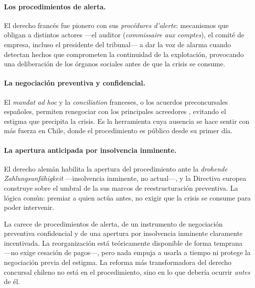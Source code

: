 \paragraph{Los procedimientos de alerta.} El derecho francés fue pionero con sus
\emph{procédures d'alerte}: mecanismos que obligan a distintos actores ---el auditor
(\emph{commissaire aux comptes}), el comité de empresa, incluso el presidente del tribunal--- a dar
la voz de alarma cuando detectan hechos que comprometen la continuidad de la explotación,
provocando una deliberación de los órganos sociales antes de que la crisis se consume.

\paragraph{La negociación preventiva y confidencial.} El \emph{mandat ad hoc} y la
\emph{conciliation} franceses, o los acuerdos preconcursales españoles, permiten renegociar con los
principales acreedores , evitando el estigma que precipita la crisis. Es la
herramienta cuya ausencia se hace sentir con más fuerza en Chile, donde el procedimiento es público
desde su primer día.

\paragraph{La apertura anticipada por insolvencia inminente.} El derecho alemán habilita la apertura
del procedimiento ante la \emph{drohende Zahlungsunfähigkeit} ---insolvencia inminente, no
actual---, y la Directiva europea construye sobre el umbral de la
 sus marcos de reestructuración preventiva. La lógica común:
premiar a quien actúa antes, no exigir que la crisis se consume para poder intervenir.

\begin{alerta}
La \LIR{} carece de procedimientos de alerta, de un instrumento de negociación preventiva
confidencial y de una apertura por insolvencia inminente claramente incentivada. La reorganización
está teóricamente disponible de forma temprana ---no exige cesación de pagos---, pero nada empuja a
usarla a tiempo ni protege la negociación previa del estigma. La reforma más transformadora del
derecho concursal chileno no está en el procedimiento, sino en lo que debería ocurrir \emph{antes}
de él.
\end{alerta}

\bloquePractico

